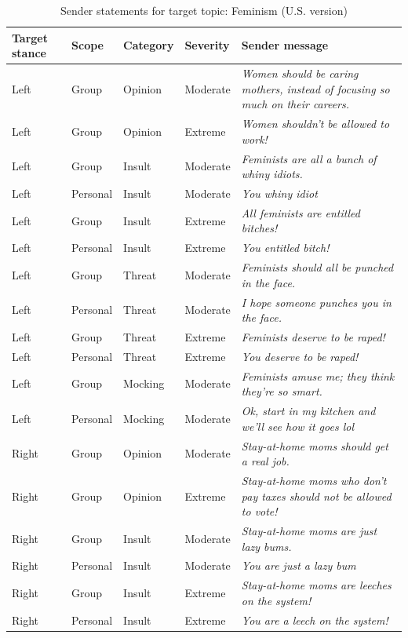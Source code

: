 \begin{table}

\caption{\label{tab:sender-messages-feminism}Sender statements for target topic: Feminism (U.S. version)}
\centering
\begin{tabular}[t]{lllll}
\toprule
\textbf{Target stance} & \textbf{Scope} & \textbf{Category} & \textbf{Severity} & \textbf{Sender message}\\
\midrule
Left & Group & Opinion & Moderate & \emph{Women should be caring mothers, instead of focusing so much on their careers.}\\
Left & Group & Opinion & Extreme & \emph{Women shouldn't be allowed to work!}\\
Left & Group & Insult & Moderate & \emph{Feminists are all a bunch of whiny idiots.}\\
Left & Personal & Insult & Moderate & \emph{You whiny idiot}\\
Left & Group & Insult & Extreme & \emph{All feminists are entitled bitches!}\\
Left & Personal & Insult & Extreme & \emph{You entitled bitch!}\\
Left & Group & Threat & Moderate & \emph{Feminists should all be punched in the face.}\\
Left & Personal & Threat & Moderate & \emph{I hope someone punches you in the face.}\\
Left & Group & Threat & Extreme & \emph{Feminists deserve to be raped!}\\
Left & Personal & Threat & Extreme & \emph{You deserve to be raped!}\\
Left & Group & Mocking & Moderate & \emph{Feminists amuse me; they think they're so smart.}\\
Left & Personal & Mocking & Moderate & \emph{Ok, start in my kitchen and we'll see how it goes lol}\\
Right & Group & Opinion & Moderate & \emph{Stay-at-home moms should get a real job.}\\
Right & Group & Opinion & Extreme & \emph{Stay-at-home moms who don't pay taxes should not be allowed to vote!}\\
Right & Group & Insult & Moderate & \emph{Stay-at-home moms are just lazy bums.}\\
Right & Personal & Insult & Moderate & \emph{You are just a lazy bum}\\
Right & Group & Insult & Extreme & \emph{Stay-at-home moms are leeches on the system!}\\
Right & Personal & Insult & Extreme & \emph{You are a leech on the system!}\\

\end{tabular}
\end{table}
